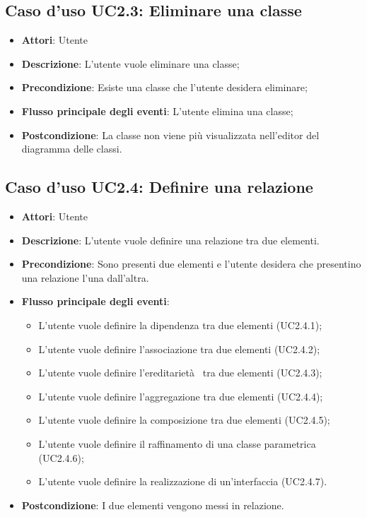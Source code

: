 \documentclass[../AnalisiDeiRequisiti.tex]{subfiles}
\begin{document}
	\subsection{Caso d'uso UC2.3: Eliminare una classe}
	\begin{itemize}
		\item \textbf{Attori}: Utente
		\item \textbf{Descrizione}: L'utente vuole eliminare una classe;
		\item \textbf{Precondizione}: Esiste una classe che l'utente desidera eliminare;
		\item \textbf{Flusso principale degli eventi}: L'utente elimina una classe;
		\item \textbf{Postcondizione}: La classe non viene più visualizzata nell'editor del diagramma delle classi.
	\end{itemize}
	\subsection{Caso d'uso UC2.4: Definire una relazione}
	\begin{itemize}
		\item \textbf{Attori}: Utente
		\item \textbf{Descrizione}: L'utente vuole definire una relazione tra due elementi.
		\item \textbf{Precondizione}: Sono presenti due elementi e l'utente desidera che presentino una relazione l'una dall'altra.
		\item \textbf{Flusso principale degli eventi}: \begin{itemize}
			\item L'utente vuole definire la dipendenza tra due elementi (UC2.4.1);
			\item L'utente vuole definire l'associazione tra due elementi (UC2.4.2);
			\item L'utente vuole definire l'ereditarietà  tra due elementi (UC2.4.3);
			\item L'utente vuole definire l'aggregazione tra due elementi (UC2.4.4);
			\item L'utente vuole definire la composizione tra due elementi (UC2.4.5);
			\item L'utente vuole definire il raffinamento di una classe parametrica (UC2.4.6);
			\item L'utente vuole definire la realizzazione di un'interfaccia (UC2.4.7).
		\end{itemize}
		\item \textbf{Postcondizione}: I due elementi vengono messi in relazione.
	\end{itemize}
\end{document}
